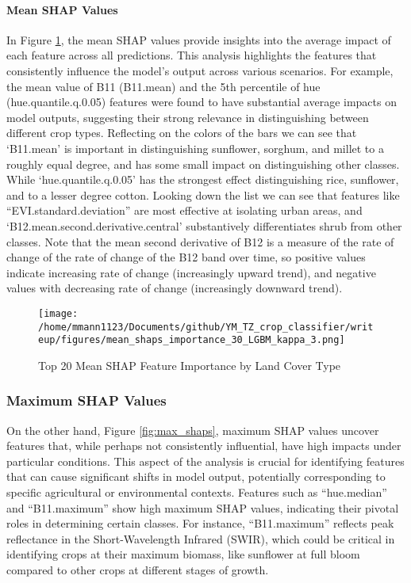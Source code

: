 \documentclass[
]{article}
\begin{document}
\hypertarget{mean-shap-values}{%
\paragraph{Mean SHAP Values}\label{mean-shap-values}}

In Figure \ref{fig:mean_shaps}, the mean SHAP values provide insights
into the average impact of each feature across all predictions. This
analysis highlights the features that consistently influence the model's
output across various scenarios. For example, the mean value of B11
(B11.mean) and the 5th percentile of hue (hue.quantile.q.0.05) features
were found to have substantial average impacts on model outputs,
suggesting their strong relevance in distinguishing between different
crop types. Reflecting on the colors of the bars we can see that
`B11.mean' is important in distinguishing sunflower, sorghum, and millet
to a roughly equal degree, and has some small impact on distinguishing
other classes. While `hue.quantile.q.0.05' has the strongest effect
distinguishing rice, sunflower, and to a lesser degree cotton. Looking
down the list we can see that features like ``EVI.standard.deviation''
are most effective at isolating urban areas, and
`B12.mean.second.derivative.central' substantively differentiates shrub
from other classes. Note that the mean second derivative of B12 is a
measure of the rate of change of the rate of change of the B12 band over
time, so positive values indicate increasing rate of change
(increasingly upward trend), and negative values with decreasing rate of
change (increasingly downward trend).

\begin{figure}[H]
    \centering
    \texttt{[image: /home/mmann1123/Documents/github/YM\_TZ\_crop\_classifier/writeup/figures/mean\_shaps\_importance\_30\_LGBM\_kappa\_3.png]} %
    \caption{Top 20 Mean SHAP Feature Importance by Land Cover Type}
    \label{fig:mean_shaps} %
\end{figure}

\hypertarget{maximum-shap-values}{%
\subsubsection{Maximum SHAP Values}\label{maximum-shap-values}}

On the other hand, Figure \ref{fig:max_shaps}, maximum SHAP values
uncover features that, while perhaps not consistently influential, have
high impacts under particular conditions. This aspect of the analysis is
crucial for identifying features that can cause significant shifts in
model output, potentially corresponding to specific agricultural or
environmental contexts. Features such as ``hue.median'' and
``B11.maximum'' show high maximum SHAP values, indicating their pivotal
roles in determining certain classes. For instance, ``B11.maximum''
reflects peak reflectance in the Short-Wavelength Infrared (SWIR), which
could be critical in identifying crops at their maximum biomass, like
sunflower at full bloom compared to other crops at different stages of
growth.
\end{document}
